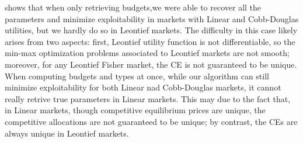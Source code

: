  shows that when only retrieving budgets,we were able to recover all the parameters and minimize exploitability in markets with Linear and Cobb-Douglas utilities, but we hardly do so in Leontief markets. The difficulty in this case likely arises from two aspects: first, Leontief utility function is not differentiable, so the min-max optimization problems associated to Leontief
markets are not smooth; moreover, for any Leontief Fisher market, the CE is not guaranteed to be unique. 
When computing budgets and types at once, while our algorithm can still minimize exploitability for both Linear nad Cobb-Douglas markets, it cannot really retrive true parameters in Linear markets. This may due to the fact that, in Linear markets, though competitive equilibrium prices are unique, the competitive allocations are not guaranteed to be unique; by contrast, the CEs are always unique in Leontief markets. 